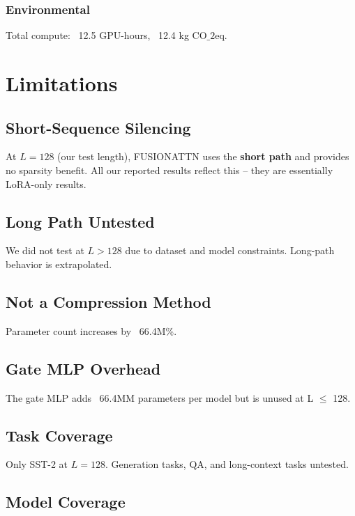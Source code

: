 \subsubsection{Environmental}
Total compute: ~12.5 GPU-hours, ~12.4 kg CO$\_2$eq.



\section{Limitations}

\subsection{Short-Sequence Silencing}

At $L = 128$ (our test length), FUSIONATTN uses the \textbf{short path} and 
provides no sparsity benefit. All our reported results reflect this -- they 
are essentially LoRA-only results.

\subsection{Long Path Untested}

We did not test at $L > 128$ due to dataset and model constraints. Long-path 
behavior is extrapolated.

\subsection{Not a Compression Method}

Parameter count increases by ~66.4M\%.

\subsection{Gate MLP Overhead}

The gate MLP adds ~66.4MM parameters per model but is unused at 
L $\le$ 128.

\subsection{Task Coverage}

Only SST-2 at $L = 128$. Generation tasks, QA, and long-context tasks 
untested.

\subsection{Model Coverage}

